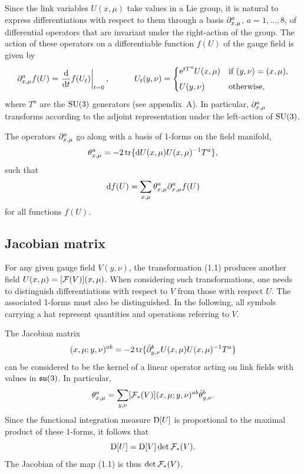 Since the link variables $U(x,\mu)$ take values in a Lie group,
it is natural to express differentiations with respect
to them through a basis
$\partial^a_{x,\mu}$, $a=1,\ldots,8$, of
differential operators that are invariant under the right-action
of the group.
The action of these operators
on a differentiable function $f(U)$ of the gauge field
is given by
\begin{equation}
  \partial_{x,\mu}^af(U)=\left.{\mathrm{d}\over\mathrm{d} t}
  f(U_t)\right|_{t=0},\qquad\quad
  U_t(y,\nu)=
  \begin{cases}
    \mathrm{e}^{tT^a}U(x,\mu) & \text{if $(y,\nu)=(x,\mu)$,}\\[1.0ex]
    U(y,\nu)            & \text{otherwise,}
  \end{cases}
\end{equation}
where $T^a$ are the $\mathrm{SU}(3)$ generators (see appendix~A).
In particular,
$\partial^a_{x,\mu}$ transforms according to the adjoint
representation under the left-action of $\mathrm{SU}(3)$.

The operators $\partial^a_{x,\mu}$ go along with
a basis of 1-forms on the field manifold,
\begin{equation}
  \theta^a_{x,\mu}=-2\,\mathrm{tr}\{\mathrm{d} U(x,\mu)U(x,\mu)^{-1}T^a\},
\end{equation}
such that
\begin{equation}
  \mathrm{d} f(U)=\sum_{x,\mu}\theta^a_{x,\mu}\partial^a_{x,\mu}f(U)
\end{equation}
for all functions $f(U)$.


\subsection{Jacobian matrix}

For any given gauge field $V(y,\nu)$,
the transformation (1.1) produces another field
$U(x,\mu)=[\mathcal{F}(V)](x,\mu)$.
When considering such transformations, one
needs to distinguish differentiations with respect to $V$
from those with respect $U$. The associated 1-forms must
also be distinguished. In the following, all symbols
carrying a hat represent quantities and operations
referring to $V$.

The Jacobian matrix
\begin{equation}
  [\transs(V)](x,\mu;y,\nu)^{ab}=
  -2\,\tr\{\hat{\du}^b_{y,\nu}U(x,\mu)U(x,\mu)^{-1}T^a\}
\end{equation}
can be considered to be the kernel of a linear operator acting
on link fields with
values in $\mathfrak{su}(3)$. In particular,
\begin{equation}
  \theta^a_{x,\mu}=\sum_{y,\nu}[\mathcal{F}_{*}(V)](x,\mu;y,\nu)^{ab}
  \hat{\theta}^b_{y,\nu}.
\end{equation}
Since the functional integration measure $\mathrm{D}[U]$
is proportional to the maximal product of these
1-forms, it follows that
\begin{equation}
  \mathrm{D}[U]=\mathrm{D}[V]\det\mathcal{F}_{*}(V).
\end{equation}
The Jacobian of the map (1.1) is thus $\det\mathcal{F}_{*}(V)$.

